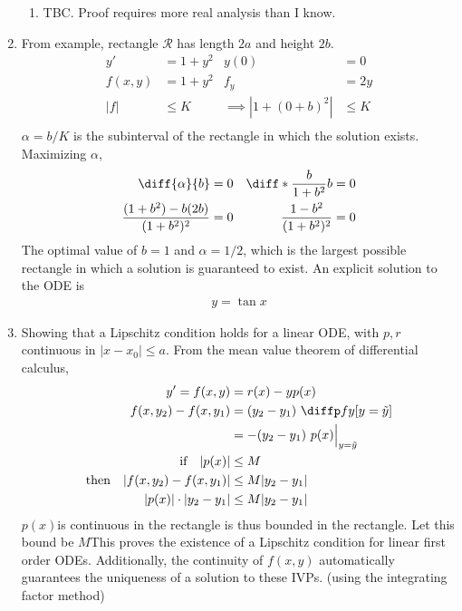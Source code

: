 \begin{enumerate}
\begin{enumerate}
              \item TBC. Proof requires more real analysis than I know.
          \end{enumerate}

    \item From example, rectangle $ \mathcal{R} $ has length $ 2a $ and height $ 2b $.
          \begin{align}
              y'      & = 1 + y^{2} & y(0)                     & = 0    \\
              f(x, y) & = 1 + y^{2} & f_{y}                    & = 2y   \\
              |f|     & \leq K      & \implies |1 + (0+b)^{2}| & \leq K \\
          \end{align}
          $ \alpha = b/K$ is the subinterval of the rectangle in which the solution
          exists. Maximizing $ \alpha $,
          \begin{align}
              \diff{\alpha}{b}                          & = 0 & \diff*{\frac{b}{1+b^{2}}}{b}  & = 0 \\
              \frac{(1+b^{2}) - b(2b)}{(1 + b^{2})^{2}} & = 0 & \frac{1-b^{2}}{(1+b^{2})^{2}} & = 0
          \end{align}
          The optimal value of $ b = 1 $ and $ \alpha = 1/2 $, which is the largest possible
          rectangle in which a solution is guaranteed to exist.
          An explicit solution to the ODE is
          \begin{align}
              y = \tan x
          \end{align}

    \item Showing that a Lipschitz condition holds for a linear ODE, with $ p, r $
          continuous in $ |x - x_{0}| \leq a $. From the mean value theorem of differential
          calculus,
          \begin{align}
              y' = f(x, y)                                  & = r(x) - yp(x)                                  \\
              f(x, y_{2}) - f(x, y_{1})                     & = (y_{2} - y_{1})\ \diffp fy[y = \tilde{y}]     \\
                                                            & = -(y_{2} - y_{1})\  p(x) \Big|_{y = \tilde{y}} \\
              \text{if} \quad |p(x)|                        & \leq M \quad                                    \\
              \text{then} \quad |f(x, y_{2}) - f(x, y_{1})| & \leq M|y_{2} - y_{1}|                           \\
              |p(x)| \cdot |y_{2} - y_{1}|                  & \leq M|y_{2} - y_{1}|
          \end{align}
          $ p(x) $is continuous in the rectangle is thus bounded in the rectangle. Let this bound
          be $ M $This proves the existence of a Lipschitz condition for linear first order ODEs.
          Additionally, the continuity of $ f(x, y) $ automatically guarantees the uniqueness of a
          solution to these IVPs. (using the integrating factor method)


\end{enumerate}
